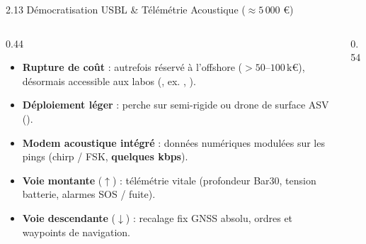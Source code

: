\begin{frame}{2.13 Démocratisation USBL \& Télémétrie Acoustique ($\approx 5\,000$ €)}
  \begin{columns}[T, onlytextwidth]
    \begin{column}{0.44\textwidth}
      \begin{block}{}
        \scriptsize
        \begin{itemize}\setlength{\itemsep}{2pt}\setlength{\parskip}{0pt}
          \item \textbf{Rupture de coût} : autrefois réservé à l'offshore ($>50\text{--}100\,\text{k€}$), désormais accessible aux labos (, ex. , ).
          \item \textbf{Déploiement léger} : perche sur semi-rigide ou drone de surface ASV ().
        \end{itemize}
      \end{block}

      \vspace{-0.15em}
      \begin{block}{}
        \scriptsize
        \begin{itemize}\setlength{\itemsep}{2pt}\setlength{\parskip}{0pt}
          \item \textbf{Modem acoustique intégré} : données numériques modulées sur les pings (chirp / FSK, \textbf{quelques kbps}).
          \item \textbf{Voie montante} ($\uparrow$) : télémétrie vitale (profondeur Bar30, tension batterie, alarmes SOS / fuite).
          \item \textbf{Voie descendante} ($\downarrow$) : recalage fix GNSS absolu, ordres et waypoints de navigation.
        \end{itemize}
      \end{block}
    \end{column}

    \begin{column}{0.54\textwidth}
      \centering
\end{column}
\end{columns}
\end{frame}
